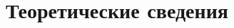 \documentclass[a4paper,11pt]{extarticle}
\begin{document}

\section*{Теоретические сведения}
\end{document}
